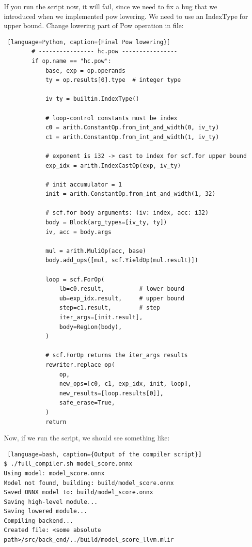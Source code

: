 \documentclass[../main.tex]{subfiles}
\begin{document}
If you run the  script now, it will fail, since we need
to fix a bug that we introduced when we implemented pow lowering. We need to
use an IndexType for  upper bound.
Change lowering part of Pow operation in  file:

\begin{lstlisting} [language=Python, caption={Final Pow lowering}]
        # ---------------- hc.pow ----------------
        if op.name == "hc.pow":
            base, exp = op.operands
            ty = op.results[0].type  # integer type

            iv_ty = builtin.IndexType()

            # loop-control constants must be index
            c0 = arith.ConstantOp.from_int_and_width(0, iv_ty)
            c1 = arith.ConstantOp.from_int_and_width(1, iv_ty)

            # exponent is i32 -> cast to index for scf.for upper bound
            exp_idx = arith.IndexCastOp(exp, iv_ty)

            # init accumulator = 1
            init = arith.ConstantOp.from_int_and_width(1, 32)

            # scf.for body arguments: (iv: index, acc: i32)
            body = Block(arg_types=[iv_ty, ty])
            iv, acc = body.args

            mul = arith.MuliOp(acc, base)
            body.add_ops([mul, scf.YieldOp(mul.result)])

            loop = scf.ForOp(
                lb=c0.result,          # lower bound
                ub=exp_idx.result,     # upper bound
                step=c1.result,        # step
                iter_args=[init.result],
                body=Region(body),
            )

            # scf.ForOp returns the iter_args results
            rewriter.replace_op(
                op,
                new_ops=[c0, c1, exp_idx, init, loop],
                new_results=[loop.results[0]],
                safe_erase=True,
            )
            return
\end{lstlisting}
Now, if we run the script, we should see something like:
\begin{lstlisting} [language=bash, caption={Output of the compiler script}]
$ ./full_compiler.sh model_score.onnx
Using model: model_score.onnx
Model not found, building: build/model_score.onnx
Saved ONNX model to: build/model_score.onnx
Saving high-level module...
Saving lowered module...
Compiling backend...
Created file: <some absolute path>/src/back_end/../build/model_score_llvm.mlir
\end{lstlisting}
\end{document}
